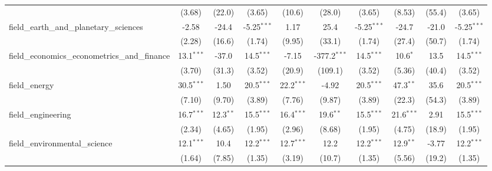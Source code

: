 \begin{tabular}{lccccccccc}
                                                               & (3.68)        & (22.0)         & (3.65)        & (10.6)        & (28.0)         & (3.65)        & (8.53)        & (55.4)         & (3.65)\\   
   field\_earth\_and\_planetary\_sciences                      & -2.58         & -24.4          & -5.25$^{***}$ & 1.17          & 25.4           & -5.25$^{***}$ & -24.7         & -21.0          & -5.25$^{***}$\\   
                                                               & (2.28)        & (16.6)         & (1.74)        & (9.95)        & (33.1)         & (1.74)        & (27.4)        & (50.7)         & (1.74)\\   
   field\_economics\_econometrics\_and\_finance                & 13.1$^{***}$  & -37.0          & 14.5$^{***}$  & -7.15         & -377.2$^{***}$ & 14.5$^{***}$  & 10.6$^{*}$    & 13.5           & 14.5$^{***}$\\   
                                                               & (3.70)        & (31.3)         & (3.52)        & (20.9)        & (109.1)        & (3.52)        & (5.36)        & (40.4)         & (3.52)\\   
   field\_energy                                               & 30.5$^{***}$  & 1.50           & 20.5$^{***}$  & 22.2$^{***}$  & -4.92          & 20.5$^{***}$  & 47.3$^{**}$   & 35.6           & 20.5$^{***}$\\   
                                                               & (7.10)        & (9.70)         & (3.89)        & (7.76)        & (9.87)         & (3.89)        & (22.3)        & (54.3)         & (3.89)\\   
   field\_engineering                                          & 16.7$^{***}$  & 12.3$^{**}$    & 15.5$^{***}$  & 16.4$^{***}$  & 19.6$^{**}$    & 15.5$^{***}$  & 21.6$^{***}$  & 2.91           & 15.5$^{***}$\\   
                                                               & (2.34)        & (4.65)         & (1.95)        & (2.96)        & (8.68)         & (1.95)        & (4.75)        & (18.9)         & (1.95)\\   
   field\_environmental\_science                               & 12.1$^{***}$  & 10.4           & 12.2$^{***}$  & 12.7$^{***}$  & 12.2           & 12.2$^{***}$  & 12.9$^{**}$   & -3.77          & 12.2$^{***}$\\   
                                                               & (1.64)        & (7.85)         & (1.35)        & (3.19)        & (10.7)         & (1.35)        & (5.56)        & (19.2)         & (1.35)\\   

\end{tabular}
